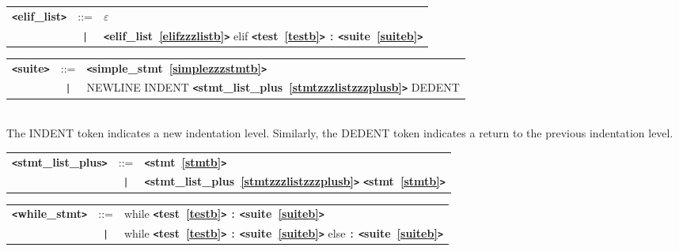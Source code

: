 \label{elifzzzlistb}
\begin{tabular}{lcl}
{\bf \verb+<+elif\_list\verb+>+} & ::=  & $\varepsilon$ \\
 & \verb+|+  & {\bf \verb+<+elif\_list~\ref{elifzzzlistb}\verb+>+}  elif {\bf \verb+<+test~\ref{testb}\verb+>+}  \verb|:| {\bf \verb+<+suite~\ref{suiteb}\verb+>+}  \\
\end{tabular}

\label{suiteb}
\begin{tabular}{lcl}
{\bf \verb+<+suite\verb+>+} & ::=  & {\bf \verb+<+simple\_stmt~\ref{simplezzzstmtb}\verb+>+}  \\
 & \verb+|+  & NEWLINE INDENT {\bf \verb+<+stmt\_list\_plus~\ref{stmtzzzlistzzzplusb}\verb+>+}  DEDENT \\
\end{tabular} \\

The INDENT token indicates a new indentation level.  Similarly, the DEDENT token indicates a return to the previous indentation level.

\label{stmtzzzlistzzzplusb}
\begin{tabular}{lcl}
{\bf \verb+<+stmt\_list\_plus\verb+>+} & ::=  & {\bf \verb+<+stmt~\ref{stmtb}\verb+>+}  \\
 & \verb+|+  & {\bf \verb+<+stmt\_list\_plus~\ref{stmtzzzlistzzzplusb}\verb+>+}  {\bf \verb+<+stmt~\ref{stmtb}\verb+>+}  \\
\end{tabular}

\label{whilezzzstmtb}

\settowidth{\tw}{while\_stmt  ::=  }
\addtolength{\tw}{2\arraycolsep}

\setlength{\len}{\textwidth}
\addtolength{\len}{-1\tw}
\begin{tabular}{lcp{\len}}
{\bf \verb+<+while\_stmt\verb+>+} & ::=  & while {\bf \verb+<+test~\ref{testb}\verb+>+}  \verb|:| {\bf \verb+<+suite~\ref{suiteb}\verb+>+}  \\
 & \verb+|+  & while {\bf \verb+<+test~\ref{testb}\verb+>+}  \verb|:| {\bf \verb+<+suite~\ref{suiteb}\verb+>+}  else \verb|:| {\bf \verb+<+suite~\ref{suiteb}\verb+>+}  \\
\end{tabular}

\label{forzzzstmtb}

